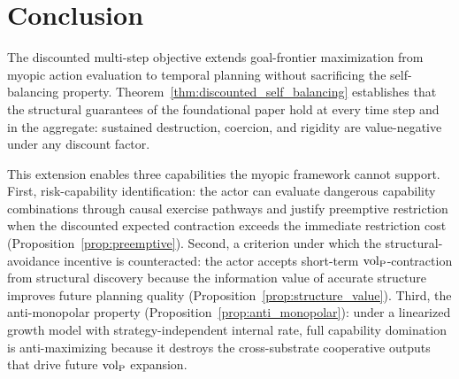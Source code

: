 \section{Conclusion}
\label{sec:conclusion}

The discounted multi-step objective extends goal-frontier maximization from
myopic action evaluation to temporal planning without sacrificing the
self-balancing property. Theorem~\ref{thm:discounted_self_balancing}
establishes that the structural guarantees of the foundational paper hold at
every time step and in the aggregate: sustained destruction, coercion, and
rigidity are value-negative under any discount factor.

This extension enables three capabilities the myopic framework cannot
support. First, risk-capability identification: the actor can evaluate
dangerous capability combinations through causal exercise pathways and
justify preemptive restriction when the discounted expected contraction
exceeds the immediate restriction cost
(Proposition~\ref{prop:preemptive}). Second, a criterion under which the
structural-avoidance incentive is counteracted: the actor accepts
short-term ${\operatorname{vol}_{\mathrm{P}}}$-contraction from structural discovery because the
information value of accurate structure improves future planning quality
(Proposition~\ref{prop:structure_value}). Third, the anti-monopolar
property (Proposition~\ref{prop:anti_monopolar}): under a linearized
growth model with strategy-independent internal rate, full capability
domination is anti-maximizing because it destroys the cross-substrate
cooperative outputs that drive future ${\operatorname{vol}_{\mathrm{P}}}$ expansion.

